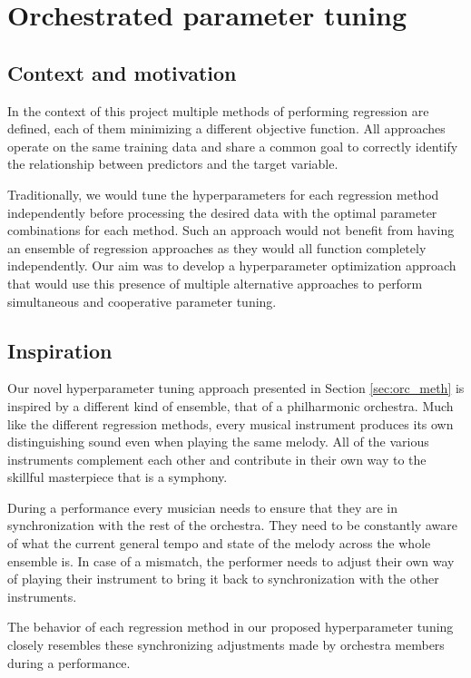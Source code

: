 \section{Orchestrated parameter tuning}

\subsection{Context and motivation}
In the context of this project multiple methods of performing regression are defined, each of them minimizing a different objective function. All approaches operate on the same training data and share a common goal to correctly identify the relationship between predictors and the target variable. 

Traditionally, we would tune the hyperparameters for each regression method independently before processing the desired data with the optimal parameter combinations for each method. Such an approach would not benefit from having an ensemble of regression approaches as they would all function completely independently. Our aim was to develop a hyperparameter optimization approach that would use this presence of multiple alternative approaches to perform simultaneous and cooperative parameter tuning.

\subsection{Inspiration}
Our novel hyperparameter tuning approach presented in Section \ref{sec:orc_meth} is inspired by a different kind of ensemble, that of a philharmonic orchestra. Much like the different regression methods, every musical instrument produces its own distinguishing sound even when playing the same melody. All of the various instruments complement each other and contribute in their own way to the skillful masterpiece that is a symphony. 

During a performance every musician needs to ensure that they are in synchronization with the rest of the orchestra. They need to be constantly aware of what the current general tempo and state of the melody across the whole ensemble is. In case of a mismatch, the performer needs to adjust their own way of playing their instrument to bring it back to synchronization with the other instruments.

The behavior of each regression method in our proposed hyperparameter tuning closely resembles these synchronizing adjustments made by orchestra members during a performance.


